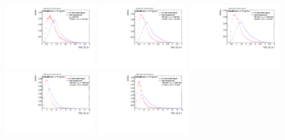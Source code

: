 \begin{figure}
\bigskip
\includegraphics[width=0.3\textwidth]{sascha_input/Appendix/Distributions/higgs/distributions/beta1/h_assisted_tj_D2_bin1.pdf} \hspace{1mm}
\includegraphics[width=0.3\textwidth]{sascha_input/Appendix/Distributions/higgs/distributions/beta1/h_assisted_tj_D2_bin2.pdf} \hspace{4mm}
\includegraphics[width=0.3\textwidth]{sascha_input/Appendix/Distributions/higgs/distributions/beta1/h_assisted_tj_D2_bin3.pdf} 
\bigskip
\includegraphics[width=0.3\textwidth]{sascha_input/Appendix/Distributions/higgs/distributions/beta1/h_assisted_tj_D2_bin4.pdf} \hspace{4mm}
\includegraphics[width=0.3\textwidth]{sascha_input/Appendix/Distributions/higgs/distributions/beta1/h_assisted_tj_D2_bin5.pdf} 


\end{figure}
